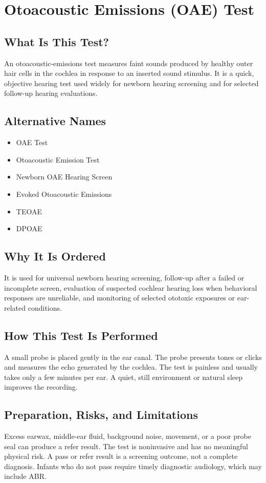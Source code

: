 \chapter{Otoacoustic Emissions (OAE) Test}

\section*{What Is This Test?}
An otoacoustic-emissions test measures faint sounds produced by healthy outer hair cells in the cochlea in response to an inserted sound stimulus. It is a quick, objective hearing test used widely for newborn hearing screening and for selected follow-up hearing evaluations.

\section*{Alternative Names}
\begin{itemize}
  \item OAE Test
  \item Otoacoustic Emission Test
  \item Newborn OAE Hearing Screen
  \item Evoked Otoacoustic Emissions
  \item TEOAE
  \item DPOAE
\end{itemize}
\section*{Why It Is Ordered}
It is used for universal newborn hearing screening, follow-up after a failed or incomplete screen, evaluation of suspected cochlear hearing loss when behavioral responses are unreliable, and monitoring of selected ototoxic exposures or ear-related conditions.

\section*{How This Test Is Performed}
A small probe is placed gently in the ear canal. The probe presents tones or clicks and measures the echo generated by the cochlea. The test is painless and usually takes only a few minutes per ear. A quiet, still environment or natural sleep improves the recording.

\section*{Preparation, Risks, and Limitations}
Excess earwax, middle-ear fluid, background noise, movement, or a poor probe seal can produce a refer result. The test is noninvasive and has no meaningful physical risk. A pass or refer result is a screening outcome, not a complete diagnosis. Infants who do not pass require timely diagnostic audiology, which may include ABR.

